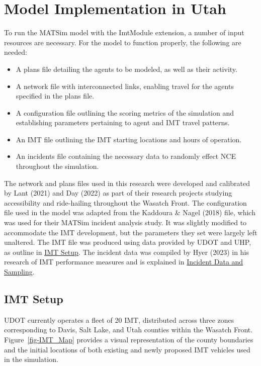 \documentclass[fancy, oneside, mastersfancy, ms]{byuthesis}
\providecommand{\tightlist}{%
  \setlength{\itemsep}{0pt}\setlength{\parskip}{0pt}}\usepackage{longtable,booktabs,array}
\begin{document}
\hypertarget{sec-model_imp}{%
\section{Model Implementation in Utah}\label{sec-model_imp}}

To run the MATSim model with the ImtModule extension, a number of input
resources are necessary. For the model to function properly, the
following are needed:

\begin{itemize}
\tightlist
\item
  A plans file detailing the agents to be modeled, as well as their
  activity.
\item
  A network file with interconnected links, enabling travel for the
  agents specified in the plans file.
\item
  A configuration file outlining the scoring metrics of the simulation
  and establishing parameters pertaining to agent and IMT travel
  patterns.
\item
  An IMT file outlining the IMT starting locations and hours of
  operation.
\item
  An incidents file containing the necessary data to randomly effect NCE
  throughout the simulation.
\end{itemize}

The network and plans files used in this research were developed and
calibrated by Lant (2021) and Day (2022) as part of their research
projects studying accessibility and ride-hailing throughout the Wasatch
Front. The configuration file used in the model was adapted from the
Kaddoura \& Nagel (2018) file, which was used for their MATSim incident
analysis study. It was slightly modified to accommodate the IMT
development, but the parameters they set were largely left unaltered.
The IMT file was produced using data provided by UDOT and UHP, as
outline in \protect\hyperlink{sec-MATSim_mod}{IMT Setup}. The incident
data was compiled by Hyer (2023) in his research of IMT performance
measures and is explained in \protect\hyperlink{sec-inc_data}{Incident
Data and Sampling}.

\hypertarget{sec-IMT_setup}{%
\subsection{IMT Setup}\label{sec-IMT_setup}}

UDOT currently operates a fleet of 20 IMT, distributed across three
zones corresponding to Davis, Salt Lake, and Utah counties within the
Wasatch Front. Figure~\ref{fig-IMT_Map} provides a visual representation
of the county boundaries and the initial locations of both existing and
newly proposed IMT vehicles used in the simulation.
\end{document}
